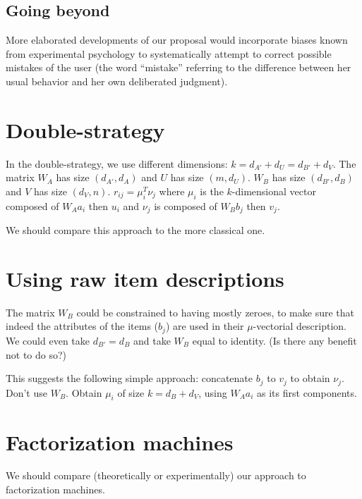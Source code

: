 \documentclass[french, english]{da2pl2018}
\begin{document}
\subsection{Going beyond}
More elaborated developments of our proposal would incorporate biases known from experimental psychology to systematically attempt to correct possible mistakes of the user (the word “mistake” referring to the difference between her usual behavior and her own deliberated judgment).



\appendix
\section{Double-strategy}
In the double-strategy, we use different dimensions: $k = d_{A'} + d_U = d_{B'} + d_V$.
The matrix $W_A$ has size $(d_{A'}, d_A)$ and $U$ has size $(m, d_U)$. $W_B$ has size $(d_{B'}, d_B)$ and $V$ has size $(d_V, n)$. $r_{ij} = \mu_i^T \nu_j$ where $\mu_i$ is the $k$-dimensional vector composed of $W_A a_i$ then $u_i$ and $\nu_j$ is composed of $W_B b_j$ then $v_j$.

We should compare this approach to the more classical one.

\section{Using raw item descriptions}
The matrix $W_B$ could be constrained to having mostly zeroes, to make sure that indeed the attributes of the items ($b_j$) are used in their $\mu$-vectorial description. We could even take $d_{B'} = d_B$ and take $W_B$ equal to identity. (Is there any benefit not to do so?)

This suggests the following simple approach: concatenate $b_j$ to $v_j$ to obtain $\nu_j$. Don’t use $W_B$. Obtain $\mu_i$ of size $k = d_B + d_V$, using $W_A a_i$ as its first components.

\section{Factorization machines}
We should compare (theoretically or experimentally) our approach to factorization machines.
\end{document}

